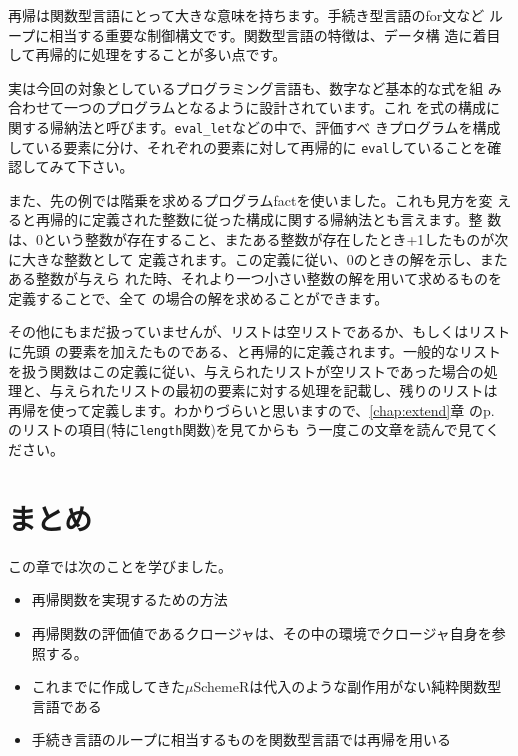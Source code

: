 再帰は関数型言語にとって大きな意味を持ちます。手続き型言語のfor文など
ループに相当する重要な制御構文です。関数型言語の特徴は、データ構
造に着目して再帰的に処理をすることが多い点です。

実は今回の対象としているプログラミング言語も、数字など基本的な式を組
み合わせて一つのプログラムとなるように設計されています。これ
を式の構成に関する帰納法と呼びます。{\tt eval\_let}などの中で、評価すべ
きプログラムを構成している要素に分け、それぞれの要素に対して再帰的に
{\tt eval}していることを確認してみて下さい。

また、先の例では階乗を求めるプログラムfactを使いました。これも見方を変
えると再帰的に定義された整数に従った構成に関する帰納法とも言えます。整
数
は、0という整数が存在すること、またある整数が存在したとき+1したものが次に大きな整数として
定義されます。この定義に従い、0のときの解を示し、またある整数が与えら
れた時、それより一つ小さい整数の解を用いて求めるものを定義することで、全て
の場合の解を求めることができます。

その他にもまだ扱っていませんが、リストは空リストであるか、もしくはリストに先頭
の要素を加えたものである、と再帰的に定義されます。一般的なリスト
を扱う関数はこの定義に従い、与えられたリストが空リストであった場合の処
理と、与えられたリストの最初の要素に対する処理を記載し、残りのリストは
再帰を使って定義します。わかりづらいと思いますので、\ref{chap:extend}章
のp. \pageref{sec:list}のリストの項目(特に{\tt length}関数)を見てからも
う一度この文章を読んで見てください。


\section{まとめ}

この章では次のことを学びました。

\begin{itemize}
\item 再帰関数を実現するための方法
\item 再帰関数の評価値であるクロージャは、その中の環境でクロージャ自身を参照する。
\item これまでに作成してきた$\mu$SchemeRは代入のような副作用がない純粋関数型言語である
\item 手続き言語のループに相当するものを関数型言語では再帰を用いる
\end{itemize}


